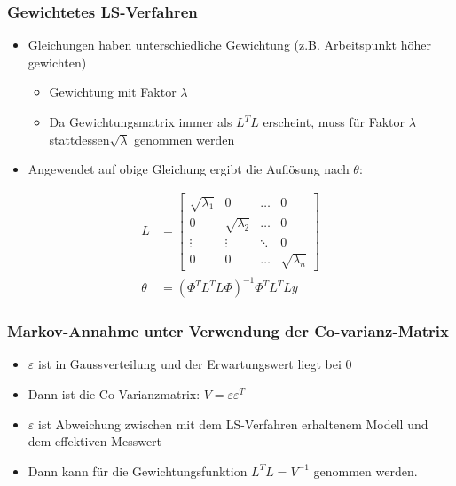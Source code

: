 \subsubsection{Gewichtetes LS-Verfahren}
\begin{itemize}
	\item Gleichungen haben unterschiedliche Gewichtung (z.B. Arbeitspunkt höher gewichten)
	\begin{itemize}
		\item Gewichtung mit Faktor $\lambda$
		\item Da Gewichtungsmatrix immer als $L^TL$ erscheint, muss für Faktor $\lambda$ stattdessen$\sqrt{\lambda}$ genommen werden
	\end{itemize}
	\item Angewendet auf obige Gleichung ergibt die Auflösung nach $\theta$: 
\end{itemize}
\begin{align*}
	L &= \begin{bmatrix}
		\sqrt{\lambda_1}&0					&\ldots&0\\
		0				&\sqrt{\lambda_2}	&\ldots&0\\
		\vdots			&\vdots				&\ddots&0\\
		0				&0					&\ldots&\sqrt{\lambda_n	}	
	\end{bmatrix}\\
	\theta &= \left(\Phi^TL^TL\Phi\right)^{-1}\Phi^TL^TLy
\end{align*}

\subsubsection{Markov-Annahme unter Verwendung der Co-varianz-Matrix}
\begin{itemize}
	\item $\varepsilon$ ist in Gaussverteilung und der Erwartungswert liegt bei 0
	\item Dann ist die Co-Varianzmatrix: $V= \varepsilon\varepsilon^T$
	\item $\varepsilon$ ist Abweichung zwischen mit dem LS-Verfahren erhaltenem Modell und dem effektiven Messwert
	\item Dann kann für die Gewichtungsfunktion $L^TL=V^{-1}$ genommen werden.
\end{itemize}

